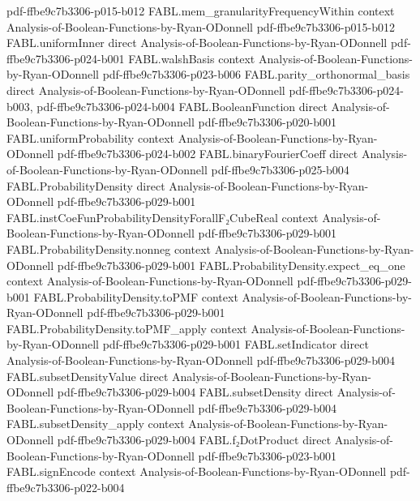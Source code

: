 \begin{theorem}
  {pdf-ffbe9c7b3306-p015-b012}
\proofstep
  {FABL.mem_granularityFrequencyWithin}
  {context}
  {Analysis-of-Boolean-Functions-by-Ryan-ODonnell}
  {pdf-ffbe9c7b3306-p015-b012}
\proofstep
  {FABL.uniformInner}
  {direct}
  {Analysis-of-Boolean-Functions-by-Ryan-ODonnell}
  {pdf-ffbe9c7b3306-p024-b001}
\proofstep
  {FABL.walshBasis}
  {context}
  {Analysis-of-Boolean-Functions-by-Ryan-ODonnell}
  {pdf-ffbe9c7b3306-p023-b006}
\proofstep
  {FABL.parity_orthonormal_basis}
  {direct}
  {Analysis-of-Boolean-Functions-by-Ryan-ODonnell}
  {pdf-ffbe9c7b3306-p024-b003,
    pdf-ffbe9c7b3306-p024-b004}
\proofstep
  {FABL.BooleanFunction}
  {direct}
  {Analysis-of-Boolean-Functions-by-Ryan-ODonnell}
  {pdf-ffbe9c7b3306-p020-b001}
\proofstep
  {FABL.uniformProbability}
  {context}
  {Analysis-of-Boolean-Functions-by-Ryan-ODonnell}
  {pdf-ffbe9c7b3306-p024-b002}
\proofstep
  {FABL.binaryFourierCoeff}
  {direct}
  {Analysis-of-Boolean-Functions-by-Ryan-ODonnell}
  {pdf-ffbe9c7b3306-p025-b004}
\proofstep
  {FABL.ProbabilityDensity}
  {direct}
  {Analysis-of-Boolean-Functions-by-Ryan-ODonnell}
  {pdf-ffbe9c7b3306-p029-b001}
\proofstep
  {FABL.instCoeFunProbabilityDensityForallF₂CubeReal}
  {context}
  {Analysis-of-Boolean-Functions-by-Ryan-ODonnell}
  {pdf-ffbe9c7b3306-p029-b001}
\proofstep
  {FABL.ProbabilityDensity.nonneg}
  {context}
  {Analysis-of-Boolean-Functions-by-Ryan-ODonnell}
  {pdf-ffbe9c7b3306-p029-b001}
\proofstep
  {FABL.ProbabilityDensity.expect_eq_one}
  {context}
  {Analysis-of-Boolean-Functions-by-Ryan-ODonnell}
  {pdf-ffbe9c7b3306-p029-b001}
\proofstep
  {FABL.ProbabilityDensity.toPMF}
  {context}
  {Analysis-of-Boolean-Functions-by-Ryan-ODonnell}
  {pdf-ffbe9c7b3306-p029-b001}
\proofstep
  {FABL.ProbabilityDensity.toPMF_apply}
  {context}
  {Analysis-of-Boolean-Functions-by-Ryan-ODonnell}
  {pdf-ffbe9c7b3306-p029-b001}
\proofstep
  {FABL.setIndicator}
  {direct}
  {Analysis-of-Boolean-Functions-by-Ryan-ODonnell}
  {pdf-ffbe9c7b3306-p029-b004}
\proofstep
  {FABL.subsetDensityValue}
  {direct}
  {Analysis-of-Boolean-Functions-by-Ryan-ODonnell}
  {pdf-ffbe9c7b3306-p029-b004}
\proofstep
  {FABL.subsetDensity}
  {direct}
  {Analysis-of-Boolean-Functions-by-Ryan-ODonnell}
  {pdf-ffbe9c7b3306-p029-b004}
\proofstep
  {FABL.subsetDensity_apply}
  {context}
  {Analysis-of-Boolean-Functions-by-Ryan-ODonnell}
  {pdf-ffbe9c7b3306-p029-b004}
\proofstep
  {FABL.f₂DotProduct}
  {direct}
  {Analysis-of-Boolean-Functions-by-Ryan-ODonnell}
  {pdf-ffbe9c7b3306-p023-b001}
\proofstep
  {FABL.signEncode}
  {context}
  {Analysis-of-Boolean-Functions-by-Ryan-ODonnell}
  {pdf-ffbe9c7b3306-p022-b004}

\end{theorem}

